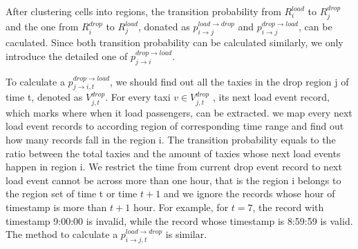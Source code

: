  After clustering cells into regions, the transition probability from $R_i^{load}$ to $R_j^{drop}$ and the one from $R_i^{drop}$ to $R_j^{load}$, donated as $p_{i\rightarrow j}^{load\rightarrow drop}$ and $p_{i\rightarrow j}^{drop\rightarrow load}$, can be caculated. Since both transition probability can be calculated similarly, we only introduce the detailed one of $p_{j\rightarrow i}^{drop\rightarrow load}$.

To calculate a $p^{drop\rightarrow load}_{j\rightarrow i,t}$, we should find out all the taxies in the drop region j of time t, denoted as $V^{drop}_{j,t}$. For every taxi $v \in V^{drop}_{j,t}$ , its next load event record, which marks where when it load passengers, can be extracted. 	we map every next load event records to according region of corresponding time range and find out how many records fall in the region i. The transition probability equals to the ratio between the total taxies  and the amount of taxies whose next load events happen in region i.
We restrict the time from current drop event record to next load event cannot be across more than one hour, that is the region i belongs to the region set of time t or time $t+1$ and we ignore the records whose hour of timestamp is more than $t+1$ hour. For example, for $t=7$,  the record with timestamp 9:00:00 is invalid, while the record whose timestamp is 8:59:59 is valid.
The method to calculate a $p^{load\rightarrow drop}_{i\rightarrow j,t}$  is similar. 
